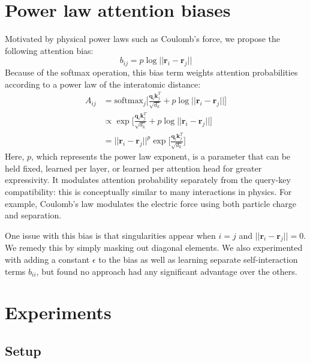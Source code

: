 \documentclass{article}
\begin{document}
\section{Power law attention biases}

Motivated by physical power laws such as Coulomb's force, we propose the following attention bias:
\begin{equation}\label{power-law-bias}
    b_{ij} = p \log || \mathbf{r}_i - \mathbf{r}_j ||
\end{equation}
Because of the softmax operation, this bias term weights attention probabilities according to a power law of the interatomic distance: 
\begin{equation}
\begin{split}
    A_{ij} &= \text{softmax}_j \biggr [\frac{\mathbf{q}_{i} \mathbf{k}_j^T}{\sqrt{d_k}} + p \log || \mathbf{r}_i - \mathbf{r}_j || \biggr] \\
    &\propto \exp \biggr[ \frac{\mathbf{q}_{i} \mathbf{k}_j^T}{\sqrt{d_k}} + p \log || \mathbf{r}_i - \mathbf{r}_j || \biggr] \\
    &= || \mathbf{r}_i - \mathbf{r}_j ||^{p}\exp \biggr[ \frac{\mathbf{q}_{i} \mathbf{k}_j^T}{\sqrt{d_k}} \biggr]
\end{split}
\end{equation}
Here, $p$, which represents the power law exponent, is a parameter that can be held fixed, learned per layer, or learned per attention head for greater expressivity. It modulates attention probability separately from the query-key compatibility: this is conceptually similar to many interactions in physics. For example, Coulomb's law modulates the electric force using both particle charge and separation. 

One issue with this bias is that singularities appear when $i=j$ and $|| \mathbf{r}_i - \mathbf{r}_j || = 0$. We remedy this by simply masking out diagonal elements. We also experimented with adding a constant $\epsilon$ to the bias as well as learning separate self-interaction terms $b_{ii}$, but found no approach had any significant advantage over the others. 

\section{Experiments}

\subsection{Setup}
\end{document}
